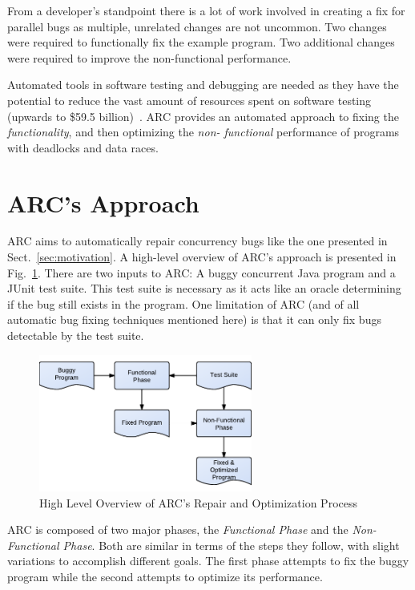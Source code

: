 \documentclass{llncs}
\begin{document}
From a developer's standpoint there is a lot of work involved in creating a fix
for parallel bugs as multiple, unrelated changes are not uncommon. Two changes
were required to functionally fix the example program. Two additional changes
were required to improve the non-functional performance.

Automated tools in software testing and debugging are needed as they have the
potential to reduce the vast amount of resources spent on software testing
(upwards to \$59.5 billion)~\cite{RTI02}. ARC provides an automated approach to
fixing the \textit{functionality}, and then optimizing the \textit{non-
functional} performance of programs with deadlocks and data races.

\section{ARC's Approach}
\label{sec:approach}

ARC aims to automatically repair concurrency bugs like the one presented in
Sect.~\ref{sec:motivation}. A high-level overview of ARC's approach is
presented in Fig.~\ref{fig:process}. There are two inputs to ARC: A buggy
concurrent Java program and a JUnit test suite. This test suite is necessary as
it acts like an oracle determining if the bug still exists in the program. One
limitation of ARC (and of all automatic bug fixing techniques mentioned here)
is that it can only fix bugs detectable by the test suite.

\begin{figure}[!h]
  \centering
  \includegraphics[width=7.0cm]{figures/process.pdf}
  \caption{High Level Overview of ARC's Repair and Optimization Process}
  \label{fig:process}
\end{figure}

ARC is composed of two major phases, the \textit{Functional Phase} and the
\textit{Non-Functional Phase}. Both are similar in terms of the steps they
follow, with slight variations to accomplish different goals. The first phase
attempts to fix the buggy program while the second attempts to optimize its
performance.
\end{document}
